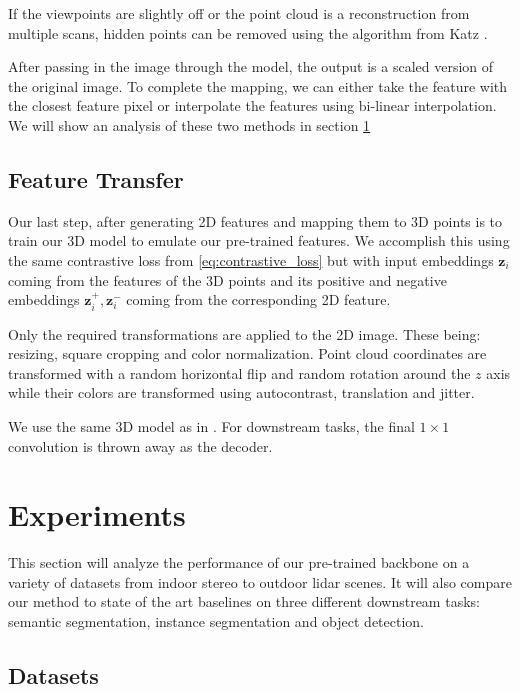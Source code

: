 \documentclass[10pt,twocolumn,letterpaper]{article}
\begin{document}
If the viewpoints are slightly off or the point cloud is a reconstruction from multiple scans, hidden points can be removed using the algorithm from Katz \etal \cite{katz2007Direct}.

After passing in the image through the model, the output is a scaled version of the original image. To complete the mapping, we can either take the feature with the closest feature pixel or interpolate the features using bi-linear interpolation. We will show an analysis of these two methods in section \ref{sec:results}

\subsection{Feature Transfer}
\label{sec:featureTransfer}

Our last step, after generating 2D features and mapping them to 3D points is to train our 3D model to emulate our pre-trained features. We accomplish this using the same contrastive loss from \ref{eq:contrastive_loss} but with input embeddings $\mathbf{z}_i$ coming from the features of the 3D points and its positive and negative embeddings $\mathbf{z}_i^{+},\mathbf{z}_i^{-}$ coming from the corresponding 2D feature.

Only the required transformations are applied to the 2D image. These being: resizing, square cropping and color normalization. Point cloud coordinates are transformed with a random horizontal flip and random rotation around the $z$ axis while their colors are transformed using autocontrast, translation and jitter.

We use the same 3D model as in \cite{xie2020pointcontrast}. For downstream tasks, the final $1\times1$ convolution is thrown away as the decoder.

\section{Experiments}
\label{sec:results}

This section will analyze the performance of our pre-trained backbone on a variety of datasets from indoor stereo to outdoor lidar scenes. It will also compare our method to state of the art baselines on three different downstream tasks: semantic segmentation, instance segmentation and object detection.

\subsection{Datasets}
\label{sec:results:datasets}
\end{document}
